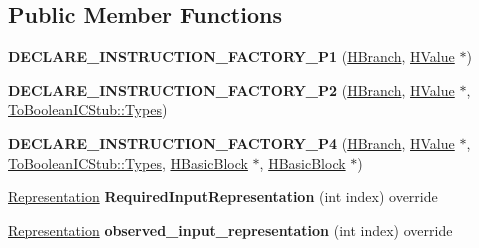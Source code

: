 \subsection*{Public Member Functions}
\begin{DoxyCompactItemize}
\item 
{\bfseries D\+E\+C\+L\+A\+R\+E\+\_\+\+I\+N\+S\+T\+R\+U\+C\+T\+I\+O\+N\+\_\+\+F\+A\+C\+T\+O\+R\+Y\+\_\+\+P1} (\hyperlink{classv8_1_1internal_1_1_h_branch}{H\+Branch}, \hyperlink{classv8_1_1internal_1_1_h_value}{H\+Value} $\ast$)\hypertarget{classv8_1_1internal_1_1_h_branch_af5de4e2cacfa4f7a5b8df9bfb0ce55a3}{}\label{classv8_1_1internal_1_1_h_branch_af5de4e2cacfa4f7a5b8df9bfb0ce55a3}

\item 
{\bfseries D\+E\+C\+L\+A\+R\+E\+\_\+\+I\+N\+S\+T\+R\+U\+C\+T\+I\+O\+N\+\_\+\+F\+A\+C\+T\+O\+R\+Y\+\_\+\+P2} (\hyperlink{classv8_1_1internal_1_1_h_branch}{H\+Branch}, \hyperlink{classv8_1_1internal_1_1_h_value}{H\+Value} $\ast$, \hyperlink{classv8_1_1internal_1_1_to_boolean_i_c_stub_1_1_types}{To\+Boolean\+I\+C\+Stub\+::\+Types})\hypertarget{classv8_1_1internal_1_1_h_branch_a21d3c1ae7f11c8aff16f46ec5d5b3adb}{}\label{classv8_1_1internal_1_1_h_branch_a21d3c1ae7f11c8aff16f46ec5d5b3adb}

\item 
{\bfseries D\+E\+C\+L\+A\+R\+E\+\_\+\+I\+N\+S\+T\+R\+U\+C\+T\+I\+O\+N\+\_\+\+F\+A\+C\+T\+O\+R\+Y\+\_\+\+P4} (\hyperlink{classv8_1_1internal_1_1_h_branch}{H\+Branch}, \hyperlink{classv8_1_1internal_1_1_h_value}{H\+Value} $\ast$, \hyperlink{classv8_1_1internal_1_1_to_boolean_i_c_stub_1_1_types}{To\+Boolean\+I\+C\+Stub\+::\+Types}, \hyperlink{classv8_1_1internal_1_1_h_basic_block}{H\+Basic\+Block} $\ast$, \hyperlink{classv8_1_1internal_1_1_h_basic_block}{H\+Basic\+Block} $\ast$)\hypertarget{classv8_1_1internal_1_1_h_branch_a920ccef8af36af9e3d40fcb8670301da}{}\label{classv8_1_1internal_1_1_h_branch_a920ccef8af36af9e3d40fcb8670301da}

\item 
\hyperlink{classv8_1_1internal_1_1_representation}{Representation} {\bfseries Required\+Input\+Representation} (int index) override\hypertarget{classv8_1_1internal_1_1_h_branch_ac80f212a1067cf374274305dabfd9ba7}{}\label{classv8_1_1internal_1_1_h_branch_ac80f212a1067cf374274305dabfd9ba7}

\item 
\hyperlink{classv8_1_1internal_1_1_representation}{Representation} {\bfseries observed\+\_\+input\+\_\+representation} (int index) override\hypertarget{classv8_1_1internal_1_1_h_branch_ae6ba0f8889fb67384ee84d8b99f0818c}{}\label{classv8_1_1internal_1_1_h_branch_ae6ba0f8889fb67384ee84d8b99f0818c}


\end{DoxyCompactItemize}
